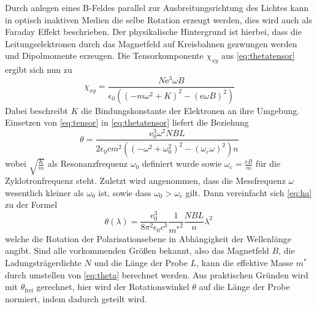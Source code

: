 Durch anlegen eines B-Feldes parallel zur Ausbreitungsrichtung des Lichtes kann in optisch inaktiven Medien die selbe Rotation erzeugt werden, dies
wird auch als Faraday Effekt beschrieben. Der physikalische Hintergrund ist hierbei, dass die Leitungselektronen durch das Magnetfeld auf Kreisbahnen
gezwungen werden und Dipolmomente erzeugen.
Die Tensorkomponente $\chi_{xy}$ aus \eqref{eq:thetatensor} ergibt sich nun zu
\begin{equation}
    \chi_{xy} = \frac{N\text{e}^3\omega B}{\epsilon_0\left(\left(-m\omega^2+K\right)^2-\left(\text{e}\omega B\right)^2\right)}
    \label{eq:tensor}
\end{equation}
Dabei beschreibt $K$ die Bindungskonstante der Elektronen an ihre Umgebung.
Einsetzen von \eqref{eq:tensor} in \eqref{eq:thetatensor} liefert die Beziehung
\begin{equation}
    \theta=\frac{\text{e}_0^3\omega^2NBL}{2\epsilon_0cm^2\left(\left(-\omega^2+\omega_0^2\right)^2-\left(\omega_{\text{c}}\omega\right)^2\right)n}
    \label{eq:ha}
\end{equation}
wobei $\sqrt{\frac{K}{m}}$ als Resonanzfrequenz $\omega_0$ definiert wurde sowie $\omega_{\text{c}} = \frac{\text{e}B}{m}$ für die Zyklotronfrequenz steht.
Zuletzt wird angenommen, dass die Messfrequenz $\omega$ wesentlich kleiner als $\omega_0$ ist, sowie dass $\omega_0>\omega_{\text{c}}$ gilt. Dann vereinfacht
sich \eqref{eq:ha} zu der Formel
\begin{equation}
    \theta(\lambda)=\frac{\text{e}_0^3}{8\pi^2\epsilon_0c^3}\frac{1}{{m^*}^2}\frac{NBL}{n}\lambda^2\,
    \label{eq:theta}
\end{equation}
welche die Rotation der Polarisationsebene in Abhängigkeit der Wellenlänge angibt.
Sind alle vorkommenden Größen bekannt, also das Magnetfeld $B$, die Ladungsträgerdichte $N$ und die Länge der Probe $L$, kann die effektive Masse
$m^*$ durch umstellen von \eqref{eq:theta} berechnet werden.
Aus praktischen Gründen wird mit $\theta_\text{frei}$ gerechnet, hier wird der Rotationswinkel $\theta$ auf die Länge der Probe normiert, indem dadurch
geteilt wird.